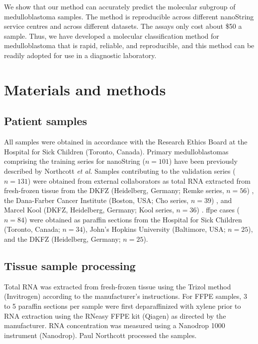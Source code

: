 We show that our method can accurately predict the molecular subgroup of medulloblastoma samples. The method is reproducible across different nanoString service centres and across different datasets. The assays only cost about \$50 a sample. Thus, we have developed a molecular classification method for medulloblastoma that is rapid, reliable, and reproducible, and this method can be readily adopted for use in a diagnostic laboratory.


\section{Materials and methods}

\subsection{Patient samples}

All samples were obtained in accordance with the Research Ethics Board at the Hospital for Sick Children (Toronto, Canada). Primary medulloblastomas comprising the training series for nanoString ($n = 101$) have been previously described by Northcott \emph{et al.} Samples contributing to the validation series ($n = 131$) were obtained from external collaborators as total RNA extracted from fresh-frozen tissue from the DKFZ (Heidelberg, Germany; Remke series, $n = 56$) , the Dana-Farber Cancer Institute (Boston, USA; Cho series, $n = 39$) , and Marcel Kool (DKFZ, Heidelberg, Germany; Kool series, $n = 36$) .  \gls{ffpe} cases ($n = 84$) were obtained as paraffin sections from the Hospital for Sick Children (Toronto, Canada; $n = 34$), John’s Hopkins University (Baltimore, USA; $n = 25$), and the DKFZ (Heidelberg, Germany; $n = 25$).

\subsection{Tissue sample processing}

Total RNA was extracted from fresh-frozen tissue using the Trizol method (Invitrogen) according to the manufacturer's instructions.  For FFPE samples, 3 to 5 paraffin sections per sample were first deparaffinized with xylene prior to RNA extraction using the RNeasy FFPE kit (Qiagen) as directed by the manufacturer.  RNA concentration was measured using a Nanodrop 1000 instrument (Nanodrop). Paul Northcott processed the samples.

